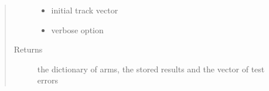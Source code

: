 \documentclass[letterpaper,10pt,english]{sphinxmanual}
\begin{document}
\begin{fulllineitems}
\begin{quote}
\begin{description}
\begin{itemize}
\item {} 
 \textendash{} initial track vector

\item {} 
 \textendash{} verbose option

\end{itemize}

\item[{Returns}] \leavevmode
the dictionary of arms, the stored results and the vector of test errors

\end{description}\end{quote}

\end{fulllineitems}

\label{\detokenize{index:module-classifiers.logistic}}
\end{document}

